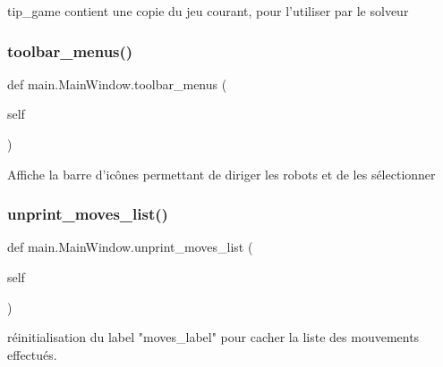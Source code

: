 \begin{DoxyVerb}tip_game contient une copie du jeu courant, pour l'utiliser par le solveur\end{DoxyVerb}
 \mbox{\label{classmain_1_1MainWindow_a521027a76aa1c1a13e897137ad43c7d9}} 
\subsubsection{\texorpdfstring{toolbar\+\_\+menus()}{toolbar\_menus()}}
{\footnotesize\ttfamily def main.\+Main\+Window.\+toolbar\+\_\+menus (\begin{DoxyParamCaption}\item[{}]{self }\end{DoxyParamCaption})}

\begin{DoxyVerb}Affiche la barre d'icônes permettant de diriger les robots et de les sélectionner\end{DoxyVerb}
 \mbox{\label{classmain_1_1MainWindow_a8c46b65de1e73cd947c826d02d31af4c}} 
\subsubsection{\texorpdfstring{unprint\+\_\+moves\+\_\+list()}{unprint\_moves\_list()}}
{\footnotesize\ttfamily def main.\+Main\+Window.\+unprint\+\_\+moves\+\_\+list (\begin{DoxyParamCaption}\item[{}]{self }\end{DoxyParamCaption})}

\begin{DoxyVerb}réinitialisation du label "moves_label" pour cacher la liste des mouvements effectués. \end{DoxyVerb}
 \mbox{\label{classmain_1_1MainWindow_a5ef7f82048e9f0fc50b1f0e1662c9e79}} 
